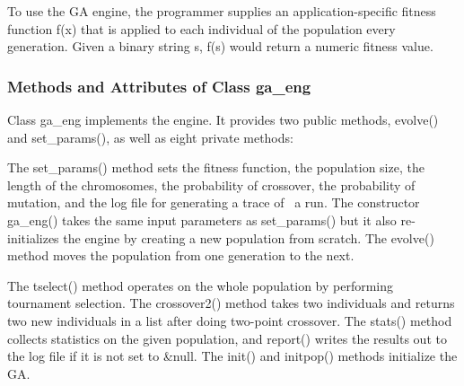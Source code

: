 To use the GA engine, the programmer supplies an application-specific
fitness function \textsf{f(x)} that is applied to each individual of
the population every generation. Given a binary string \textsf{s},
\textsf{f(s)} would return a numeric fitness value.

\subsubsection[Methods and Attributes of Class ga\_eng]{Methods and
Attributes of Class ga\_eng}

Class \textsf{ga\_eng} implements the engine. It provides
two public methods, \textsf{evolve()} and \textsf{set\_params()}, as
well as eight private methods: 


The \textsf{set\_params()} method sets the fitness function, the
population size, the length of the chromosomes, the probability of
crossover, the probability of mutation, and the log file for generating
a trace of \ a run. The constructor
\textsf{ga\_eng()} takes the same input parameters as
\textsf{set\_params()} but it also re-initializes the engine by
creating a new population from scratch. The \textsf{evolve()} method
moves the population from one generation to the next.

The \textsf{tselect()} method operates on the whole population by
performing tournament selection. The \textsf{crossover2()} method takes
two individuals and returns two new individuals in a list after doing
two-point crossover. The \textsf{stats()} method collects statistics on
the given population, and \textsf{report()} writes the results out to
the log file if it is not set to \textsf{\&null}. The \textsf{init()}
and \textsf{initpop()} methods initialize the GA.


